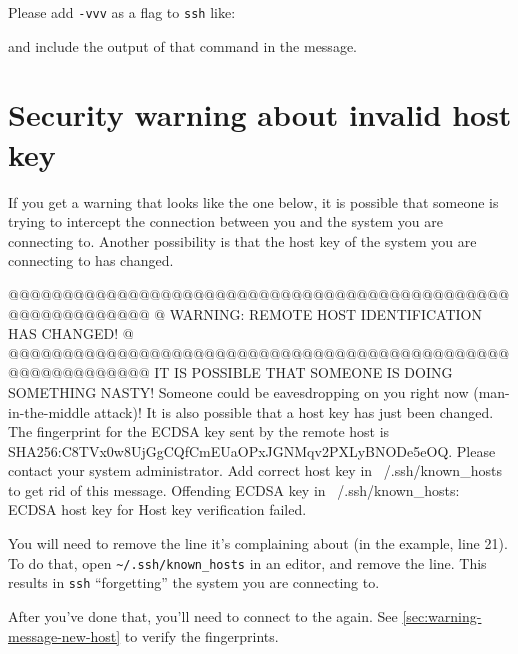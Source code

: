 \else
Please add \lstinline|-vvv| as a flag to \lstinline|ssh| like:

\begin{prompt}
\end{prompt}

and include the output of that command in the message.
\fi

\section{Security warning about invalid host key}
\label{sec:security-warning-invald-host-key}

If you get a warning that looks like the one below, it is possible
that someone is trying to intercept the connection between you and the system you are connecting to.
Another possibility is that the host key of the system you are connecting to has changed.

\ifmacORlinux

\begin{prompt}
@@@@@@@@@@@@@@@@@@@@@@@@@@@@@@@@@@@@@@@@@@@@@@@@@@@@@@@@@@@
@    WARNING: REMOTE HOST IDENTIFICATION HAS CHANGED!     @
@@@@@@@@@@@@@@@@@@@@@@@@@@@@@@@@@@@@@@@@@@@@@@@@@@@@@@@@@@@
IT IS POSSIBLE THAT SOMEONE IS DOING SOMETHING NASTY!
Someone could be eavesdropping on you right now (man-in-the-middle attack)!
It is also possible that a host key has just been changed.
The fingerprint for the ECDSA key sent by the remote host is
SHA256:C8TVx0w8UjGgCQfCmEUaOPxJGNMqv2PXLyBNODe5eOQ.
Please contact your system administrator.
Add correct host key in ~/.ssh/known_hosts to get rid of this message.
Offending ECDSA key in ~/.ssh/known_hosts:%
ECDSA host key for %
Host key verification failed.
\end{prompt}

You will need to remove the line it's complaining about (in the example, line 21).
To do that, open \lstinline|~/.ssh/known_hosts| in an editor, and remove the line. This
results in \lstinline|ssh| ``forgetting'' the system you are connecting to.

After you've done that, you'll need to connect to the \hpc again.
See \autoref{sec:warning-message-new-host} to verify the fingerprints.

\else


